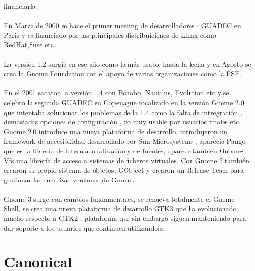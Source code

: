 \documentclass[a4paper,oneside,11pt]{article}
\begin{document}
financiarlo.
\\\\
En Marzo de 2000 se hace el primer meeting de desarrolladores : GUADEC en Paris y
es financiado por las principales distribuiciones de Linux como RedHat,Suse etc.
\\\\
La versi\'on 1.2 surgi\'o en ese año como la m\'as usable hasta la fecha y en Agosto se crea
la Gnome Foundation con el apoyo de varias organizaciones como la FSF.
\\\\
En el 2001 sacaron la versi\'on 1.4 con Bonobo, Nautilus, Evolution etc y se celebr\'o
la segunda GUADEC en Copenague focalizado en la versi\'on Gnome 2.0 que intentaba solucionar
los problemas de la 1.4 como la falta de intregraci\'on , demasiadas opciones de configuraci\'on
, no muy usable por usuarios finales etc. Gnome 2.0 introduce una nueva plataforma de
desarrollo, introdujeron un framework de accesibilidad desarrollado por Sun Microsystems
, apareci\'o Pango que es la librer\'ia de internacionalizaci\'on y de fuentes,
aparece tambi\'en Gnome-Vfs una librer\'ia de acceso a sistemas de ficheros virtuales. 
Con Gnome 2 tambi\'en crearon su propio sistema de objetos: GObject y crearon un
Release Team para gestionar las sucesivas versiones de Gnome.
\\\\
Gnome 3 surge con cambios fundamentales, se renueva totalmente el Gnome Shell, 
se crea una nueva plataforma de desarrollo GTK3 que ha evolucionado mucho respecto
a GTK2 , plataforma que sin embargo siguen manteniendo para dar soporte a los usuarios
que continuen utiliz\'andola. 

\section{Canonical}
\end{document}
